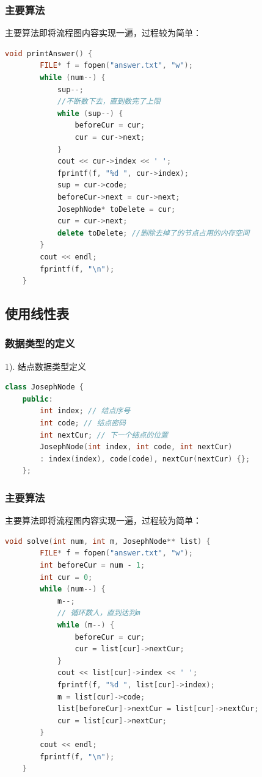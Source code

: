 \documentclass[UTF8]{article}
\begin{document}
	\subsubsection{主要算法}
	主要算法即将流程图内容实现一遍，过程较为简单：\par
	\begin{lstlisting}[language=C++]
	void printAnswer() {
		FILE* f = fopen("answer.txt", "w");
		while (num--) {
			sup--;
			//不断数下去，直到数完了上限
			while (sup--) {
				beforeCur = cur;
				cur = cur->next;
			}
			cout << cur->index << ' ';
			fprintf(f, "%d ", cur->index);
			sup = cur->code;
			beforeCur->next = cur->next;
			JosephNode* toDelete = cur;
			cur = cur->next;
			delete toDelete; //删除去掉了的节点占用的内存空间
		}
		cout << endl;
		fprintf(f, "\n");
	}
	\end{lstlisting} 
	
	
	\subsection{使用线性表}
	\subsubsection{数据类型的定义}
	1). 结点数据类型定义
	\begin{lstlisting}[language=C++]
	class JosephNode {
	public:
		int index; // 结点序号
		int code; // 结点密码
		int nextCur; // 下一个结点的位置
		JosephNode(int index, int code, int nextCur) 
		: index(index), code(code), nextCur(nextCur) {};
	};
	\end{lstlisting}
	
	\subsubsection{主要算法}
	主要算法即将流程图内容实现一遍，过程较为简单：\par
	\begin{lstlisting}[language=C++]
	void solve(int num, int m, JosephNode** list) {
		FILE* f = fopen("answer.txt", "w");
		int beforeCur = num - 1;
		int cur = 0;
		while (num--) {
			m--;
			// 循环数人，直到达到m
			while (m--) {
				beforeCur = cur;
				cur = list[cur]->nextCur;
			}
			cout << list[cur]->index << ' ';
			fprintf(f, "%d ", list[cur]->index);
			m = list[cur]->code;
			list[beforeCur]->nextCur = list[cur]->nextCur;
			cur = list[cur]->nextCur;
		}
		cout << endl;
		fprintf(f, "\n");
	}
	\end{lstlisting} 
	
\end{document}
